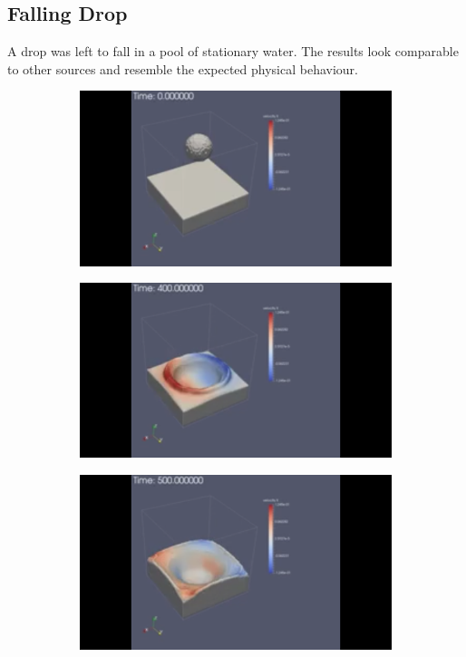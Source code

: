 \documentclass[10pt,a4paper,notitlepage]{article}
\begin{document}
\subsection{Falling Drop}
A drop was left to fall in a pool of stationary water. The results look comparable to other sources and resemble the expected physical behaviour.
\begin{figure}[H]
\centering
\begin{subfigure}{0.25\textwidth}
  \includegraphics[width=1.0\linewidth]{drop/1.png}
\end{subfigure}%
\begin{subfigure}{0.25\textwidth}
  \includegraphics[width=1.0\linewidth]{drop/2.png}
\end{subfigure}
\begin{subfigure}{0.25\textwidth}
  \includegraphics[width=1.0\linewidth]{drop/3.png}

\end{subfigure}
\end{figure}
\end{document}
